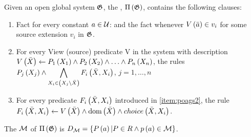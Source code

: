 \begin{defi}
\label{def:poaogs}
Given an open global system $\mathfrak{G}$, the , $\Pi\left(\mathfrak{G}\right)$, contains the following clauses:
\begin{enumerate}
\item \label{item:poags1}Fact  for every constant $a\in\mathcal{U}$: and the fact  whenever $V\left(\bar{a}\right)\in v_i$ for some source extension $v_i$ in $\mathfrak{G}$.
\item \label{item:poags2}For every View (source) predicate V in the system with description $V\left(\bar{X}\right)\leftarrow P_1\left(X_1\right)\wedge P_2\left(X_2\right)\wedge\ldots\wedge P_n\left(X_n\right)$, the rules $P_j\left(X_j\right)\wedge\displaystyle\bigwedge_{X_i\in\left( X_j\setminus\bar{X}\right)}F_i\left(\bar{X},X_i\right)$, $j=1,\ldots,n$
\item \label{item:poags3}For every predicate $F_i\left(\bar{X},X_i\right)$ introduced in \ref{item:poags2}, the rule $F_i\left(\bar{X},X_i\right)\leftarrow V\left(\bar{X}\right)\wedge\mbox{dom}\left(\bar{X}\right)\wedge choice\left(\bar{X},X_i\right)$.
\end{enumerate}
\cite{conf/ijcai/BravoB03}
\end{defi}

\begin{defi}
The  $\mathcal{M}$ of $\Pi\left(\mathfrak{G}\right)$ is $D_{\mathcal{M}}=\left\{ P\left(a\right)|P\in R\wedge p\left(a\right)\in\mathcal{M}\right\}$.
\cite{conf/ijcai/BravoB03}
\end{defi}

